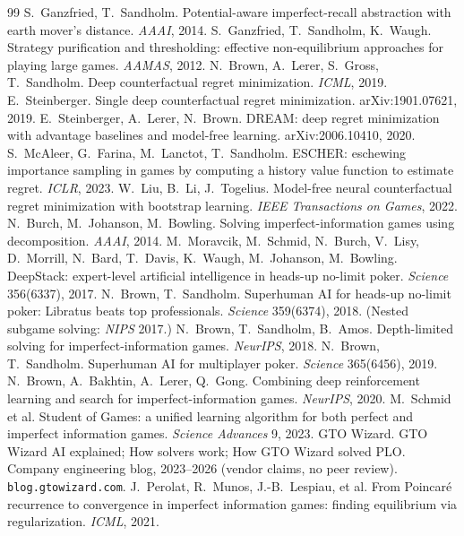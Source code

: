 \begin{thebibliography}{99}
 S.~Ganzfried, T.~Sandholm. Potential-aware imperfect-recall abstraction with earth mover's distance. \emph{AAAI}, 2014.
 S.~Ganzfried, T.~Sandholm, K.~Waugh. Strategy purification and thresholding: effective non-equilibrium approaches for playing large games. \emph{AAMAS}, 2012.
 N.~Brown, A.~Lerer, S.~Gross, T.~Sandholm. Deep counterfactual regret minimization. \emph{ICML}, 2019.
 E.~Steinberger. Single deep counterfactual regret minimization. arXiv:1901.07621, 2019.
 E.~Steinberger, A.~Lerer, N.~Brown. DREAM: deep regret minimization with advantage baselines and model-free learning. arXiv:2006.10410, 2020.
 S.~McAleer, G.~Farina, M.~Lanctot, T.~Sandholm. ESCHER: eschewing importance sampling in games by computing a history value function to estimate regret. \emph{ICLR}, 2023.
 W.~Liu, B.~Li, J.~Togelius. Model-free neural counterfactual regret minimization with bootstrap learning. \emph{IEEE Transactions on Games}, 2022.
 N.~Burch, M.~Johanson, M.~Bowling. Solving imperfect-information games using decomposition. \emph{AAAI}, 2014.
 M.~Moravcik, M.~Schmid, N.~Burch, V.~Lisy, D.~Morrill, N.~Bard, T.~Davis, K.~Waugh, M.~Johanson, M.~Bowling. DeepStack: expert-level artificial intelligence in heads-up no-limit poker. \emph{Science} 356(6337), 2017.
 N.~Brown, T.~Sandholm. Superhuman AI for heads-up no-limit poker: Libratus beats top professionals. \emph{Science} 359(6374), 2018. (Nested subgame solving: \emph{NIPS} 2017.)
 N.~Brown, T.~Sandholm, B.~Amos. Depth-limited solving for imperfect-information games. \emph{NeurIPS}, 2018.
 N.~Brown, T.~Sandholm. Superhuman AI for multiplayer poker. \emph{Science} 365(6456), 2019.
 N.~Brown, A.~Bakhtin, A.~Lerer, Q.~Gong. Combining deep reinforcement learning and search for imperfect-information games. \emph{NeurIPS}, 2020.
 M.~Schmid et al. Student of Games: a unified learning algorithm for both perfect and imperfect information games. \emph{Science Advances} 9, 2023.
 GTO Wizard. GTO Wizard AI explained; How solvers work; How GTO Wizard solved PLO. Company engineering blog, 2023--2026 (vendor claims, no peer review). \texttt{blog.gtowizard.com}.
 J.~Perolat, R.~Munos, J.-B.~Lespiau, et al. From Poincar\'e recurrence to convergence in imperfect information games: finding equilibrium via regularization. \emph{ICML}, 2021.

\end{thebibliography}
